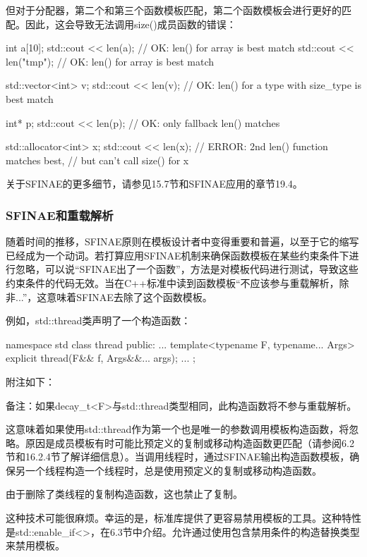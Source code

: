 但对于分配器，第二个和第三个函数模板匹配，第二个函数模板会进行更好的匹配。因此，这会导致无法调用size()成员函数的错误：

\begin{cpp}
int a[10];
std::cout << len(a); // OK: len() for array is best match
std::cout << len("tmp"); // OK: len() for array is best match

std::vector<int> v;
std::cout << len(v); // OK: len() for a type with size_type is best match

int* p;
std::cout << len(p); // OK: only fallback len() matches

std::allocator<int> x;
std::cout << len(x); // ERROR: 2nd len() function matches best,
					 // but can't call size() for x
\end{cpp}

关于SFINAE的更多细节，请参见15.7节和SFINAE应用的章节19.4。

\subsubsection{SFINAE和重载解析}

随着时间的推移，SFINAE原则在模板设计者中变得重要和普遍，以至于它的缩写已经成为一个动词。若打算应用SFINAE机制来确保函数模板在某些约束条件下进行忽略，可以说“SFINAE出了一个函数”，方法是对模板代码进行测试，导致这些约束条件的代码无效。当在C++标准中读到函数模板“不应该参与重载解析，除非...”，这意味着SFINAE去除了这个函数模板。

例如，std::thread类声明了一个构造函数：

\begin{cpp}
namespace std {
class thread {
public:
	...
	template<typename F, typename... Args>
	explicit thread(F&& f, Args&&... args);
	...
};
}
\end{cpp}

附注如下：

备注：如果decay\_t<F>与std::thread类型相同，此构造函数将不参与重载解析。

这意味着如果使用std::thread作为第一个也是唯一的参数调用模板构造函数，将忽略。原因是成员模板有时可能比预定义的复制或移动构造函数更匹配（请参阅6.2节和16.2.4节了解详细信息）。当调用线程时，通过SFINAE输出构造函数模板，确保另一个线程构造一个线程时，总是使用预定义的复制或移动构造函数。

\begin{notice}
由于删除了类线程的复制构造函数，这也禁止了复制。
\end{notice}

这种技术可能很麻烦。幸运的是，标准库提供了更容易禁用模板的工具。这种特性是std::enable\_if<>，在6.3节中介绍。允许通过使用包含禁用条件的构造替换类型来禁用模板。

